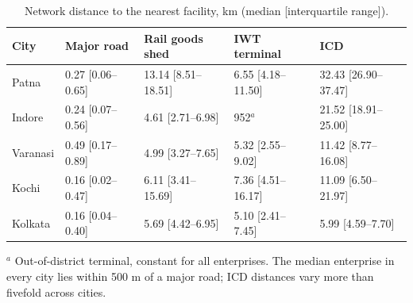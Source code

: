 \begin{table}[htbp]
\centering
\small
\caption{Network distance to the nearest facility, km (median [interquartile range]).}
\label{tab:t5_distances}
\begin{tabular}{lllll}
\toprule
City & Major road & Rail goods shed & IWT terminal & ICD \\
\midrule
Patna & 0.27 [0.06–0.65] & 13.14 [8.51–18.51] & 6.55 [4.18–11.50] & 32.43 [26.90–37.47] \\
Indore & 0.24 [0.07–0.56] & 4.61 [2.71–6.98] & 952$^{a}$ & 21.52 [18.91–25.00] \\
Varanasi & 0.49 [0.17–0.89] & 4.99 [3.27–7.65] & 5.32 [2.55–9.02] & 11.42 [8.77–16.08] \\
Kochi & 0.16 [0.02–0.47] & 6.11 [3.41–15.69] & 7.36 [4.51–16.17] & 11.09 [6.50–21.97] \\
Kolkata & 0.16 [0.04–0.40] & 5.69 [4.42–6.95] & 5.10 [2.41–7.45] & 5.99 [4.59–7.70] \\
\bottomrule
\end{tabular}
\begin{tablenotes}\footnotesize
\item $^{a}$ Out-of-district terminal, constant for all enterprises. The median enterprise in every city lies within 500 m of a major road; ICD distances vary more than fivefold across cities.
\end{tablenotes}
\end{table}
